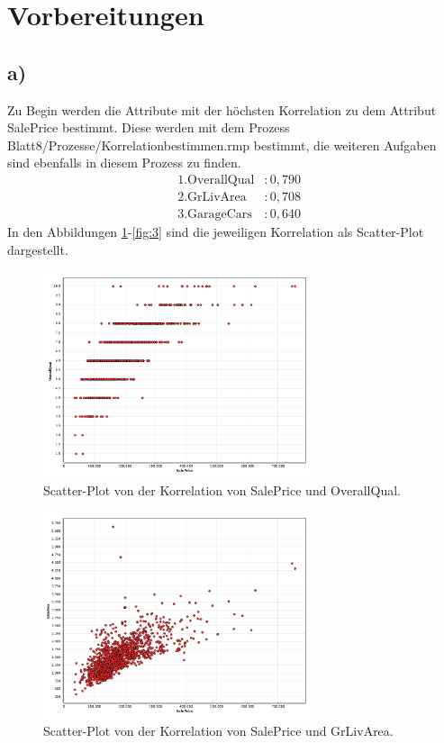 \newpage
\section{Vorbereitungen}
\label{sec:a1}
\subsection{a)}
\label{subsec:a1}
Zu Begin werden die Attribute mit der
höchsten Korrelation zu dem Attribut SalePrice bestimmt.
Diese werden mit dem Prozess Blatt8/Prozesse/Korrelationbestimmen.rmp
bestimmt, die weiteren Aufgaben sind ebenfalls in diesem Prozess zu finden.
\begin{align*}
&\text{1.OverallQual} &:0,790\\
&\text{2.GrLivArea}   &:0,708\\
&\text{3.GarageCars}  &:0,640
\end{align*}
In den Abbildungen \ref{fig:1}-\ref{fig:3} sind die jeweiligen
Korrelation als Scatter-Plot dargestellt.
\begin{figure}
  \centering
  \includegraphics[width=0.7\textwidth]{OverallQual.png}
  \caption{Scatter-Plot von der Korrelation von SalePrice
  und OverallQual.}
  \label{fig:1}
\end{figure}

\begin{figure}
  \centering
  \includegraphics[width=0.7\textwidth]{GrLivArea.png}
  \caption{Scatter-Plot von der Korrelation von SalePrice
  und GrLivArea.}
  \label{fig:2}
\end{figure}


